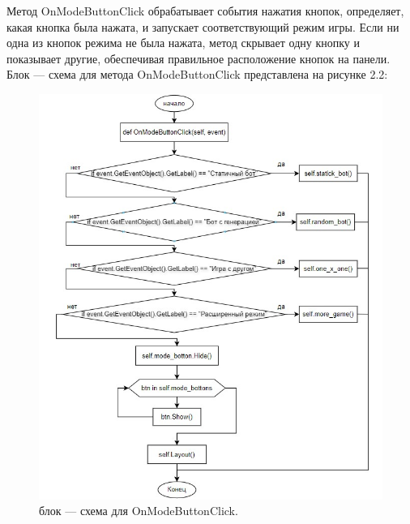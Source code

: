 Метод OnModeButtonClick обрабатывает события нажатия кнопок, определяет, какая кнопка была нажата, и запускает соответствующий режим игры. Если ни одна из кнопок режима не была нажата, метод скрывает одну кнопку и показывает другие, обеспечивая правильное расположение кнопок на панели.
Блок --- схема для метода OnModeButtonClick представлена на рисунке 2.2:
\begin{figure}[H]
\graphicspath{ {img/} }
\centering
\includegraphics[width = 15cm]{часть.jpg}
\caption{блок --- схема для OnModeButtonClick.}
\end{figure}
